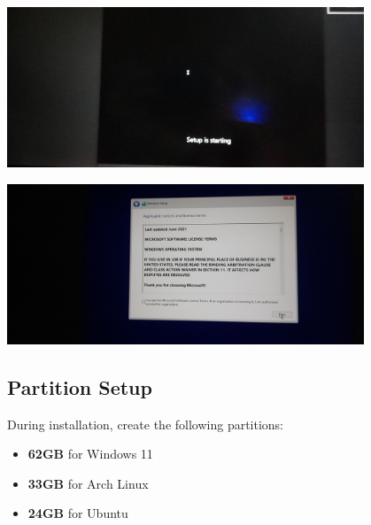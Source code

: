 \documentclass[a4paper]{article}
\begin{document}
\begin{center}
    \includegraphics[width=0.8\textwidth]{11.jpeg} %
\end{center}
\begin{center}
    \includegraphics[width=0.8\textwidth]{12.jpeg} %
\end{center}

\subsection{Partition Setup}
During installation, create the following partitions:
\begin{itemize}
    \item \textbf{62GB} for Windows 11
    \item \textbf{33GB} for Arch Linux
    \item \textbf{24GB} for Ubuntu
\end{itemize}
\end{document}
